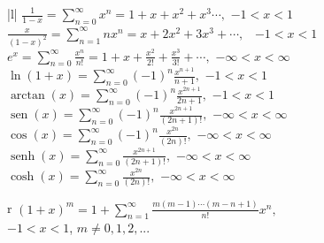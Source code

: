 \documentclass[10pt,a4paper]{article}%
\renewcommand{\sin}{\operatorname{sen}}
\renewcommand{\sinh}{\operatorname{senh}}
\begin{document}
\begin{minipage}[r]{7.8cm}
{{\tabulinesep=1.2mm
\begin{tabu}{|l|} 
\hline
 $\displaystyle \frac{1}{1-x}=\sum_{n=0}^\infty x^n=1+x+x^2+x^3\cdots,$ \quad$\displaystyle -1<x<1$ \\ 
\hline
 $\displaystyle \frac{x}{(1-x)^2}=\sum_{n=1}^\infty n x^n=x+2x^2+3x^3+\cdots,$ \ $\displaystyle -1<x<1$ \\ 
\hline
 $\displaystyle e^x=\sum_{n=0}^\infty \frac{x^n}{n!}=1+x+\frac{x^2}{2!}+\frac{x^3}{3!}+\cdots,$  \quad$\displaystyle -\infty<x<\infty$ \\ 
\hline
 $\displaystyle \ln(1+x)=\sum_{n=0}^\infty(-1)^n \frac{x^{n+1}}{n+1},$  \quad$\displaystyle -1<x<1$ \\ 
\hline
 $\displaystyle \arctan(x)=\sum_{n=0}^\infty(-1)^n \frac{x^{2n+1}}{2n+1},$  \quad$\displaystyle -1<x<1$ \\ 
\hline
 $\displaystyle \sin(x)=\sum_{n=0}^\infty(-1)^n \frac{x^{2n+1}}{(2n+1)!},$  \quad$\displaystyle -\infty<x<\infty$ \\ 
\hline
 $\displaystyle \cos(x)=\sum_{n=0}^\infty(-1)^n \frac{x^{2n}}{(2n)!},$  \quad$\displaystyle -\infty<x<\infty$ \\ 
\hline
 $\displaystyle \sinh(x)=\sum_{n=0}^\infty \frac{x^{2n+1}}{(2n+1)!},$  \quad$\displaystyle -\infty<x<\infty$ \\ 
\hline
 $\displaystyle \cosh(x)=\sum_{n=0}^\infty \frac{x^{2n}}{(2n)!},$  \quad$\displaystyle -\infty<x<\infty$ \\ 
\hline
\begin{tabu}{r} $\displaystyle (1+x)^m=1+\sum_{n=1}^\infty \frac{m(m-1)\cdots (m-n+1)}{n!}x^n,$ \\$\displaystyle -1<x<1$, $m\neq 0,1,2,...$ \end{tabu}\\ 
\hline
\end{tabu}}


}
\end{minipage}

\vspace{15pt}
\end{document}
